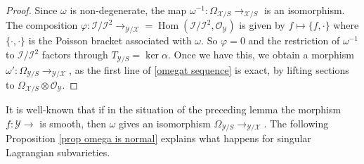 \documentclass[a4paper,11pt,final]{amsart}
\theoremstyle{plain}
\theoremstyle{definition}
\numberwithin{equation}{section}
\theoremstyle{remark}
\begin{document}
\begin{proof}
Since $\omega$ is non-degenerate, the map $\omega^{-1}:\Omega_{{{\mathcal X}}/S} {\xrightarrow{\ \ }}_{{{\mathcal X}}/S}$ is an isomorphism. The composition ${\varphi}:{{\mathcal I}}/{{\mathcal I}}^2 {\xrightarrow{\ \ }}_{{{\mathcal Y}}/{{\mathcal X}}}={\operatorname{Hom}}({{\mathcal I}}/{{\mathcal I}}^2,{{\mathcal O}}_{{\mathcal Y}})$ is given by $f\mapsto \{f, \cdot\}$ where $\{\cdot,\cdot\}$ is the Poisson bracket associated with $\omega$. So ${\varphi}=0$ and the restriction of $\omega^{-1}$ to ${{\mathcal I}}/{{\mathcal I}}^2$ factors through $T_{{{\mathcal Y}}/S}=\ker \alpha$. Once we have this, we obtain a morphism $\omega' : \Omega_{{{\mathcal Y}}/S} {\xrightarrow{\ \ }}_{{{\mathcal Y}}/{{\mathcal X}}}$, as the first line of \eqref{omegat sequence} is exact, by lifting sections to $\Omega_{{{\mathcal X}}/S} \otimes {{\mathcal O}}_{{\mathcal Y}}$.
\end{proof}
It is well-known that if in the situation of the preceding lemma the morphism $f:{{\mathcal Y}}{\xrightarrow{\ \ }}$ is smooth, then $\omega$ gives an isomorphism $\Omega_{{{\mathcal Y}}/S} {\xrightarrow{\ \ }}_{{{\mathcal Y}}/{{\mathcal X}}}$.
The following Proposition \ref{prop omega is normal} explains what happens for singular Lagrangian subvarieties.
\end{document}
